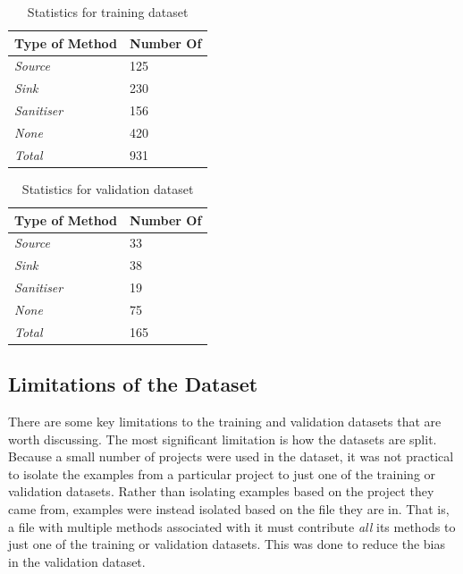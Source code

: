 \begin{table}[!htbp]
    \caption{Statistics for training dataset}
    \label{tab:training_dataset}
    \begin{center}
    \begin{tabular}{l|l}
            \textbf{Type of Method} & \textbf{Number Of} \\
            \hline
            \emph{Source}         & 125       \\
            \emph{Sink}           & 230       \\
            \emph{Sanitiser}      & 156       \\
            \emph{None}           & 420       \\
            \emph{Total}          & 931      
    \end{tabular}
    \end{center}
\end{table}

\begin{table}[!htbp]
    \caption{Statistics for validation dataset}
    \label{tab:validation_dataset}
    \begin{center}
    \begin{tabular}{l|l}
            \textbf{Type of Method} & \textbf{Number Of} \\
            \hline
            \emph{Source}         & 33       \\
            \emph{Sink}           & 38       \\
            \emph{Sanitiser}      & 19       \\
            \emph{None}           & 75       \\
            \emph{Total}          & 165      
    \end{tabular}
    \end{center}
\end{table}

\subsection{Limitations of the Dataset}
\label{dataset_limitations}

\noindent
There are some key limitations to the training and validation datasets that are worth discussing. The most significant limitation is how the datasets are split. Because a small number of projects were used in the dataset, it was not practical to isolate the examples from a particular project to just one of the training or validation datasets. Rather than isolating examples based on the project they came from, examples were instead isolated based on the file they are in. That is, a file with multiple methods associated with it must contribute \emph{all} its methods to just one of the training or validation datasets. This was done to reduce the bias in the validation dataset. \\

